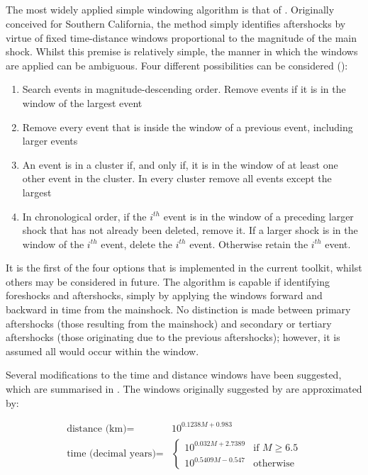 \subsection{\cite{GardnerKnopoff1974}}

The most widely applied simple windowing algorithm is that of 
\cite{GardnerKnopoff1974}. Originally conceived for Southern California, 
the method simply identifies aftershocks by virtue of fixed time-distance
windows proportional to the magnitude of the main shock. Whilst this 
premise is relatively simple, the manner in which the windows are 
applied can be ambiguous. Four different possibilities can be 
considered (\cite{LuenStark2012}):

\begin{enumerate}
\item Search events in magnitude-descending order. Remove events if it is 
    in the window of the largest event
\item Remove every event that is inside the window of a previous event, 
    including larger events
\item An event is in a cluster if, and only if, it is in the window of at 
    least one other event in the cluster. In every cluster remove all 
    events except the largest
\item In chronological order, if the $i^{th}$ event is in the window of a 
    preceding larger shock that has not already been deleted, remove it. 
    If a larger shock is in the window of the $i^{th}$ event, delete the 
    $i^{th}$ event. Otherwise retain the $i^{th}$ event.
\end{enumerate}

It is the first of the four options that is implemented in the current 
toolkit, whilst others may be considered in future.  The algorithm is 
capable if identifying foreshocks and aftershocks, simply by applying 
the windows forward and backward in time from the mainshock. 
No distinction is made between primary aftershocks (those resulting 
from the mainshock) and secondary or tertiary aftershocks (those 
originating due to the previous aftershocks); however, it is assumed 
all would occur within the window.

Several modifications to the time and distance windows have been 
suggested, which are summarised in \cite{vanStiphout2012}. The windows 
originally suggested by \cite{GardnerKnopoff1974} are approximated by:

\begin{equation}\begin{split} 
\mbox{distance (km)} = &10^{0.1238 M + 0.983}\\
\mbox{time (decimal years)} = & 
\begin{cases} 10^{0.032 M + 2.7389} & \text{if $M \geq 6.5$} \\ 
              10^{0.5409 M - 0.547} & \mbox{otherwise}  \end{cases}\end{split}
\end{equation}

